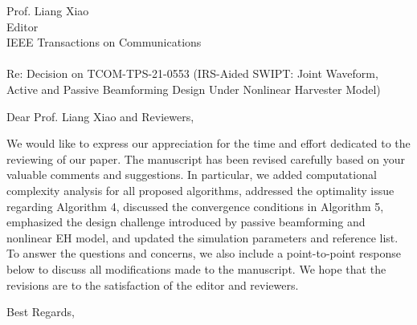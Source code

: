 \documentclass[a4paper, 10pt]{letter}
\date{}
\begin{document}
	\begin{letter}{Prof. Liang Xiao \\ Editor \\ IEEE Transactions on Communications \\ ~ \\ Re: Decision on TCOM-TPS-21-0553 (IRS-Aided SWIPT: Joint Waveform, Active and Passive Beamforming Design Under Nonlinear Harvester Model)}
		\opening{Dear Prof. Liang Xiao and Reviewers,}

		We would like to express our appreciation for the time and effort dedicated to the reviewing of our paper. The manuscript has been revised carefully based on your valuable comments and suggestions. In particular, we added computational complexity analysis for all proposed algorithms, addressed the optimality issue regarding Algorithm 4, discussed the convergence conditions in Algorithm 5, emphasized the design challenge introduced by passive beamforming and nonlinear EH model, and updated the simulation parameters and reference list. To answer the questions and concerns, we also include a point-to-point response below to discuss all modifications made to the manuscript. We hope that the revisions are to the satisfaction of the editor and reviewers.

		\closing{Best Regards,}
	\end{letter}
\end{document}
